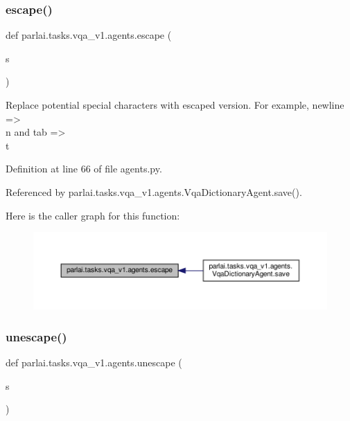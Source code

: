 \subsubsection{\texorpdfstring{escape()}{escape()}}
{\footnotesize\ttfamily def parlai.\+tasks.\+vqa\+\_\+v1.\+agents.\+escape (\begin{DoxyParamCaption}\item[{}]{s }\end{DoxyParamCaption})}

\begin{DoxyVerb}Replace potential special characters with escaped version.
For example, newline => \\n and tab => \\t
\end{DoxyVerb}
 

Definition at line 66 of file agents.\+py.



Referenced by parlai.\+tasks.\+vqa\+\_\+v1.\+agents.\+Vqa\+Dictionary\+Agent.\+save().

Here is the caller graph for this function\+:
\nopagebreak
\begin{figure}[H]
\begin{center}
\leavevmode
\includegraphics[width=350pt]{namespaceparlai_1_1tasks_1_1vqa__v1_1_1agents_a09703660c96aab40da3aa7f2386486cb_icgraph}
\end{center}
\end{figure}
\mbox{\label{namespaceparlai_1_1tasks_1_1vqa__v1_1_1agents_ab44e9835e0cedea3719e3baebfe0e94b}} 
\subsubsection{\texorpdfstring{unescape()}{unescape()}}
{\footnotesize\ttfamily def parlai.\+tasks.\+vqa\+\_\+v1.\+agents.\+unescape (\begin{DoxyParamCaption}\item[{}]{s }\end{DoxyParamCaption})}

